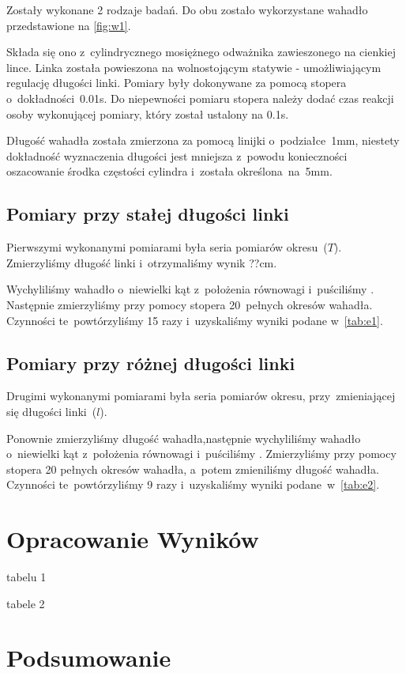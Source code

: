 \documentclass{fizraport}
\begin{document}
Zostały wykonane 2 rodzaje badań. Do obu zostało wykorzystane wahadło przedstawione na \figurename{\ref{fig:w1}}.

Składa się ono z~cylindrycznego mosiężnego odważnika zawieszonego na cienkiej lince. Linka została powieszona na wolnostojącym statywie - umożliwiającym regulację długości linki.
Pomiary były dokonywane za pomocą stopera o~dokładności~0.01s. Do niepewności pomiaru stopera należy dodać czas reakcji osoby wykonującej pomiary, który został ustalony na 0.1s.

Długość wahadła została zmierzona za pomocą linijki o~podziałce~1mm, niestety dokładność wyznaczenia długości jest mniejsza z~powodu konieczności oszacowanie środka częstości cylindra i~została określona~na~5mm.


\subsection{Pomiary przy stałej długości linki}
Pierwszymi wykonanymi pomiarami była seria pomiarów okresu~($T$). Zmierzyliśmy długość linki i~otrzymaliśmy wynik ??cm. 

Wychyliliśmy wahadło o~niewielki kąt z~położenia równowagi i~puściliśmy . Następnie zmierzyliśmy przy pomocy stopera 20~pełnych okresów wahadła. Czynności te~powtórzyliśmy 15 razy i~uzyskaliśmy wyniki podane w~\tablename{\ref{tab:e1}}. 

\subsection{Pomiary przy różnej długości linki}
Drugimi wykonanymi pomiarami była seria pomiarów okresu, przy~zmieniającej się długości linki~($l$). 

Ponownie zmierzyliśmy długość wahadła,następnie wychyliliśmy wahadło o~niewielki kąt z~położenia równowagi i~puściliśmy .  Zmierzyliśmy przy pomocy stopera 20 pełnych okresów wahadła, a~potem zmieniliśmy długość wahadła. Czynności te~powtórzyliśmy 9 razy i~uzyskaliśmy wyniki podane~w~\tablename{\ref{tab:e2}}. 

\section{Opracowanie Wyników}
\begin{table}
\caption{tabelu 1}
 \label{tab:e1}
\end{table}

\begin{table}
\caption{tabele 2}
 \label{tab:e2}
\end{table}
\section{Podsumowanie}
\end{document}
